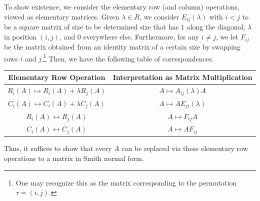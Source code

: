 \documentclass[10pt]{mypackage}
\begin{document}
To show existence, we consider the elementary row (and column) operations, viewed as elementary matrices. Given $\lambda\in R$, we consider $E_{ij}(\lambda)$ with $i < j$ to be a square matrix of size to be determined size that has $1$ along the diagonal, $\lambda$ in position $(i,j)$, and $0$ everywhere else. Furthermore, for any $i\neq j$, we let $F_{ij}$ be the matrix obtained from an identity matrix of a certain size by swapping rows $i$ and $j$.\footnote{One may recognize this as the matrix corresponding to the permutation $\tau = \left( i,j \right)$.} Then, we have the following table of correspondences.
\begin{center}
  \renewcommand{\arraystretch}{1.5}
  \begin{tabular}{c|c}
    Elementary Row Operation & Interpretation as Matrix Multiplication\\
    \hline
    $R_i(A) \mapsto R_i(A) + \lambda R_j(A)$ & $A\mapsto A_{ij}(\lambda)A$\\
    $C_i(A) \mapsto C_i(A) + \lambda C_j(A)$ & $A\mapsto AE_{ji}(\lambda)$\\
    $R_i(A) \leftrightarrow R_j(A)$ & $A\mapsto F_{ij}A$\\
    $C_i(A)\leftrightarrow C_j(A)$ & $A\mapsto AF_{ij}$
  \end{tabular}
\end{center}
Thus, it suffices to show that every $A$ can be replaced via these elementary row operations to a matrix in Smith normal form.
\end{document}
